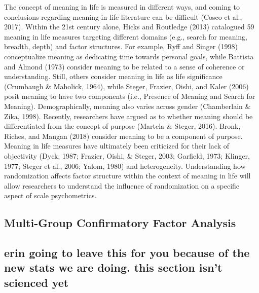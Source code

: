 \documentclass[man,draftall]{apa6}
\begin{document}
The concept of meaning in life is measured in different ways, and coming to conclusions regarding meaning in life literature can be difficult (Cosco et al., 2017). Within the 21st century alone, Hicks and Routledge (2013) catalogued 59 meaning in life measures targeting different domains (e.g., search for meaning, breadth, depth) and factor structures. For example, Ryff and Singer (1998) conceptualize meaning as dedicating time towards personal goals, while Battista and Almond (1973) consider meaning to be related to a sense of coherence or understanding. Still, others consider meaning in life as life significance (Crumbaugh \& Maholick, 1964), while Steger, Frazier, Oishi, and Kaler (2006) posit meaning to have two components (i.e., Presence of Meaning and Search for Meaning). Demographically, meaning also varies across gender (Chamberlain \& Zika, 1998). Recently, researchers have argued as to whether meaning should be differentiated from the concept of purpose (Martela \& Steger, 2016). Bronk, Riches, and Mangan (2018) consider meaning to be a component of purpose. Meaning in life measures have ultimately been criticized for their lack of objectivity (Dyck, 1987; Frazier, Oishi, \& Steger, 2003; Garfield, 1973; Klinger, 1977; Steger et al., 2006; Yalom, 1980) and heterogeneity. Understanding how randomization affects factor structure within the context of meaning in life will allow researchers to understand the influence of randomization on a specific aspect of scale psychometrics.

\hypertarget{multi-group-confirmatory-factor-analysis}{%
\subsection{Multi-Group Confirmatory Factor Analysis}\label{multi-group-confirmatory-factor-analysis}}

\hypertarget{erin-going-to-leave-this-for-you-because-of-the-new-stats-we-are-doing.-this-section-isnt-scienced-yet}{%
\subsection{erin going to leave this for you because of the new stats we are doing. this section isn't scienced yet}\label{erin-going-to-leave-this-for-you-because-of-the-new-stats-we-are-doing.-this-section-isnt-scienced-yet}}
\end{document}
